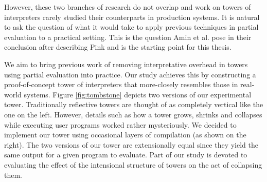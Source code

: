 \documentclass[a4paper,12pt,twoside,openright]{report}
\theoremstyle{definition}
\begin{document}

However, these two branches of research do not overlap and work on towers of interpreters rarely studied their counterparts in production systems. It is natural to ask the question of what it would take to apply previous techniques in partial evaluation to a practical setting. This is the question Amin et al. pose in their conclusion after describing Pink \cite{amin2017collapsing} and is the starting point for this thesis.

We aim to bring previous work of removing interpretative overhead in towers using partial evaluation into practice. Our study achieves this by constructing a proof-of-concept tower of interpreters that more-closely resembles those in real-world systems. Figure \ref{fig:tombstone} depicts two versions of our experimental tower. Traditionally reflective towers are thought of as completely vertical like the one on the left. However, details such as how a tower grows, shrinks and collapses while executing user programs worked rather mysteriously. We decided to implement our tower using occasional layers of compilation (as shown on the right). The two versions of our tower are extensionally equal since they yield the same output for a given program to evaluate. Part of our study is devoted to evaluating the effect of the intensional structure of towers on the act of collapsing them.
\end{document}
